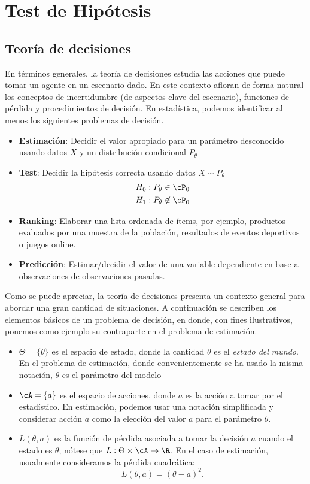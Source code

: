 \chapter{Test de Hipótesis}


\section{Teoría de decisiones}
\label{sec:teoría_de_decisiones}

En términos generales, la teoría de decisiones estudia las acciones que puede tomar un agente en un escenario dado. En este contexto afloran de forma natural los conceptos de incertidumbre (de aspectos clave del escenario), funciones de pérdida y procedimientos de decisión. En estadística, podemos identificar al menos los siguientes problemas de decisión.


\begin{itemize}
	\item \textbf{Estimación}: Decidir el valor apropiado para un parámetro desconocido usando datos $X$ y un distribución condicional $P_\theta$
	\item \textbf{Test}: Decidir la hipótesis correcta usando datos $X\sim P_\theta$
	\begin{align}
		H_0: P_\theta\in\cP_0\\
		H_1: P_\theta\not\in\cP_0
	\end{align}
	\item \textbf{Ranking}: Elaborar una lista ordenada de ítems, por ejemplo, productos evaluados por una muestra de la población, resultados de eventos deportivos o juegos online. 
	\item \textbf{Predicción}: Estimar/decidir el valor de una variable dependiente en base a observaciones de observaciones pasadas. 
\end{itemize}

Como se puede apreciar, la teoría de decisiones presenta un contexto general para abordar una gran cantidad de situaciones. A continuación se describen los elementos básicos de un problema de decisión, en donde, con fines ilustrativos, ponemos como ejemplo su contraparte en el problema de estimación.

\begin{itemize}
	\item $\Theta = \{\theta\}$ es el espacio de estado, donde la cantidad $\theta$ es el \textit{estado del mundo}. En el problema de estimación, donde convenientemente se ha usado la misma notación, $\theta$ es el parámetro del modelo
	\item $\cA=\{a\}$ es el espacio de acciones, donde $a$ es la acción a tomar por el estadístico. En estimación, podemos usar una notación simplificada y considerar acción $a$  como la elección del valor $a$ para el parámetro $\theta$. 
	\item $L(\theta,a)$ es la función de pérdida asociada a tomar la decisión $a$ cuando el estado es $\theta$; nótese que $L:\Theta\times\cA\rightarrow\R$. En el caso de estimación, usualmente consideramos la pérdida cuadrática:
	\begin{equation}
		L(\theta,a) = (\theta-a)^2.
	\end{equation}
\end{itemize}


